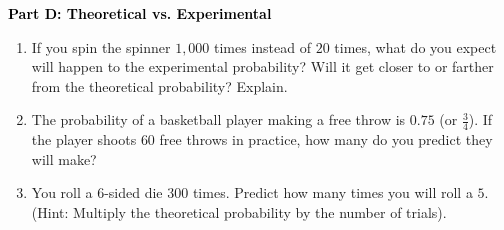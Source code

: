 \documentclass[12pt, letterpaper, fleqn]{article}
\begin{document}
\newpage

\begin{tcolorbox}[colback=customteal!20]
\large\textcolor{black}{\textbf{Part D: Theoretical vs. Experimental}}
\end{tcolorbox}

\vspace{3mm}

\begin{enumerate}[itemsep=2.5cm, leftmargin=0.6cm, resume]
\item If you spin the spinner $1,000$ times instead of $20$ times, what do you expect will happen to the experimental probability? Will it get closer to or farther from the theoretical probability? Explain.
\item The probability of a basketball player making a free throw is $0.75$ (or $\frac{3}{4}$). If the player shoots $60$ free throws in practice, how many do you predict they will make?
\item You roll a 6-sided die $300$ times. Predict how many times you will roll a $5$. (Hint: Multiply the theoretical probability by the number of trials).
\end{enumerate}
\end{document}
